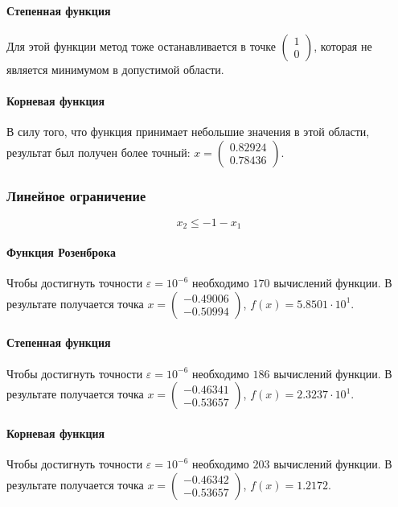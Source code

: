 \documentclass[a4paper,12pt,notitlepage,pdftex,headsepline]{scrartcl}
\begin{document}
      \paragraph{Степенная функция}
        Для этой функции метод тоже останавливается в точке
        $\left(\begin{matrix} 1\\ 0\end{matrix}\right)$, которая не является
          минимумом в допустимой области.
      \paragraph{Корневая функция}
        В силу того, что функция принимает небольшие значения в этой области,
        результат был получен более точный: $x = \left(\begin{matrix}
          0.82924\\
          0.78436\end{matrix}\right)$.
    \subsubsection{Линейное ограничение}
      \[
        x_2 \leqslant -1 - x_1
      \]

      \paragraph{Функция Розенброка}
      Чтобы достигнуть точности $\varepsilon = 10^{-6}$ необходимо $170$
      вычислений функции.
      В результате получается точка $x = \left(\begin{matrix} -0.49006\\
        -0.50994\end{matrix}\right)$, $f(x) = 5.8501 \cdot 10^{1}$.
      \paragraph{Степенная функция}
      Чтобы достигнуть точности $\varepsilon = 10^{-6}$ необходимо $186$
      вычислений функции.
      В результате получается точка $x = \left(\begin{matrix} -0.46341\\
        -0.53657\end{matrix}\right)$, $f(x) = 2.3237\cdot 10^{1}$.
      \paragraph{Корневая функция}
      Чтобы достигнуть точности $\varepsilon = 10^{-6}$ необходимо $203$
      вычислений функции.
      В результате получается точка $x = \left(\begin{matrix} -0.46342\\
        -0.53657\end{matrix}\right)$, $f(x) = 1.2172$.
\end{document}
